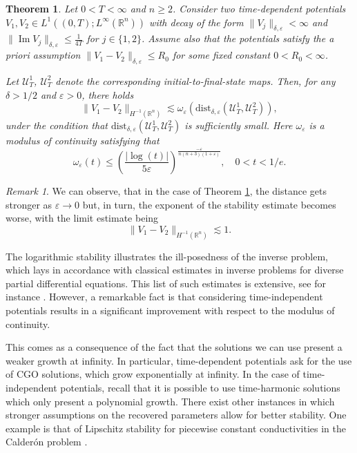\documentclass[10pt,a4paper]{amsart}
\newtheorem{theorem}[proposition]{Theorem}
\theoremstyle{remark}
\newtheorem{remark}[proposition]{Remark}
\theoremstyle{definition}
\newcommand{\R}{\mathbb{R}}
\newcommand{\dist}{\mathrm{dist}}
\def\Im{\mathop\mathrm{Im}}
\def\ve{\varepsilon}
\def\lec{\lesssim}
\def\cal{\mathcal}
\begin{document}
\begin{theorem}\label{th: stability_t_dependent}
	Let $0<T<\infty$ and $n\geq 2$. Consider two time-dependent potentials $V_1, V_2 \in L^1((0,T);L^\infty(\R^n))$ with decay of the form $\|V_j\|_{\delta, \ve}< \infty$ and $\|\Im V_j\|_{\delta, \ve}\leq \frac{1}{4T} $ for $j\in\{1, 2\}$. Assume also that the potentials satisfy the a priori assumption $\|V_1 - V_2\|_{\delta, \ve} \leq R_0$ for some fixed constant $0<R_0<\infty$.
	 
	Let $\cal{U}_T^1$, $\cal{U}_T^2$ denote the corresponding initial-to-final-state maps. Then, for any $\delta >1/2$ and $ \varepsilon>0$, there holds 
	\begin{equation}\label{eq: stability1_est_t_dependent}
	\|V_1 - V_2\|_{H^{-1}(\R^n)} \lesssim \omega_\ve(\dist_{\delta,\varepsilon} (\cal{U}_T^1, \cal{U}_T^2)),
	\end{equation}
	under the condition that $\dist_{\delta,\varepsilon} (\cal{U}_T^1, \cal{U}_T^2)$ is sufficiently small. Here $\omega_\ve$ is a modulus of continuity satisfying that
	\[
	\omega_\ve(t)\leq\left(\frac{|\log(t)|}{5\varepsilon}\right)^{\frac{-\varepsilon}{n(n+3)(1+\varepsilon)}},\quad 0<t<1/e.
	\]
\end{theorem}




%
\begin{remark}\label{remark1}
	We can observe, that in the case of Theorem \ref{th: stability_t_dependent}, the distance gets stronger as $\varepsilon\to 0$ but, in turn, the exponent of the stability estimate becomes worse, with the limit estimate being \[\|V_1 - V_2\|_{H^{-1}(\R^n)} \lec 1.\] 
\end{remark}

%
 The logarithmic stability illustrates the ill-posedness of the inverse problem, which lays in accordance with classical estimates in inverse problems for diverse partial differential equations. This list of such estimates is extensive, see for instance \cite{Alessandrini01011988, Stefanov1990, Caro2011,Caro2013}. However, a remarkable fact is that considering time-independent potentials results in a significant improvement with respect to the modulus of continuity. 
 
 This comes as a consequence of the fact that the solutions we can use present a weaker growth at infinity. In particular, time-dependent potentials ask for the use of CGO solutions, which grow exponentially at infinity. In the case of time-independent potentials, recall that it is possible to use time-harmonic solutions which only present a polynomial growth. There exist other instances in which stronger assumptions on the recovered parameters allow for better stability. One example is that of Lipschitz stability for piecewise constant conductivities in the Calder\'on problem \cite{Alessandrini2005}.
\end{document}
